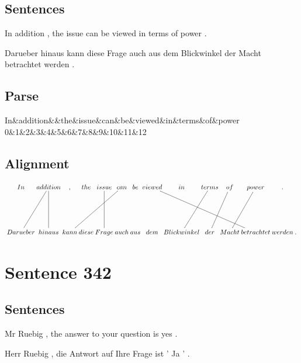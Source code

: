 \documentclass{report}
\begin{document}
\subsection*{Sentences}
In addition , the issue can be viewed in terms of power .

\noindent Darueber hinaus kann diese Frage auch aus dem Blickwinkel der Macht betrachtet werden .



\subsection*{Parse}
\begin{dependency}[theme=simple]
\begin{deptext}[column sep=.5cm, row sep=.1ex]
In\&addition\&\&the\&issue\&can\&be\&viewed\&in\&terms\&of\&power\\
0\&1\&2\&3\&4\&5\&6\&7\&8\&9\&10\&11\&12\\
\end{deptext}
\end{dependency}


\subsection*{Alignment}
\scriptsize{
$
\xymatrix@C-2.3pc{
In & addition \ar @{-} [ddl] \ar @{-} [dd] & , & the & issue \ar @{-} [dd] & can \ar @{-} [ddlll] & be & viewed \ar @{-} [ddrrrr] & in & terms \ar @{-} [ddl] & of \ar @{-} [ddl] & power \ar @{-} [ddl] & .\\\\
Darueber & hinaus & kann & diese & Frage & auch & aus & dem & Blickwinkel & der & Macht & betrachtet & werden & .
}$}
\newpage\section*{Sentence 342}

\subsection*{Sentences}
Mr Ruebig , the answer to your question is yes .

\noindent Herr Ruebig , die Antwort auf Ihre Frage ist ' Ja ' .
\end{document}
